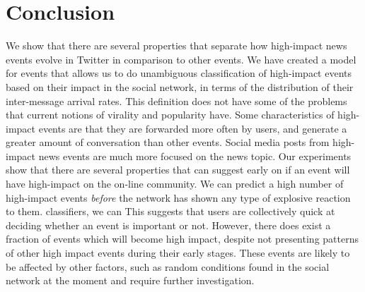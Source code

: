 
\section*{Conclusion}

We show that there are several properties that separate how
high-impact news events evolve in Twitter in comparison to other
events. We have created a model for events that allows us to do
unambiguous classification of high-impact events based on their impact
in the social network, in terms of the distribution of their
inter-message arrival rates. This definition does not have some of the
problems that current notions of virality and popularity have. Some
characteristics of high-impact events are that they are forwarded more
often by users, and generate a greater amount of conversation than
other events.  Social media posts from high-impact news events are
much more focused on the news topic. Our experiments show that there
are several properties that can suggest early on if an event will have
high-impact on the on-line community.  We can predict a high number of
high-impact events {\em before} the network has shown any type of
explosive reaction to them. %
classifiers, we can
This suggests that users are collectively quick at deciding whether an
event is important or not.  However, there does exist a fraction of
events which will become high impact, despite not presenting
patterns of other high impact events during their early stages.  These
events are likely to be affected by other factors, such as random
conditions found in the social network at the moment and require
further investigation.
